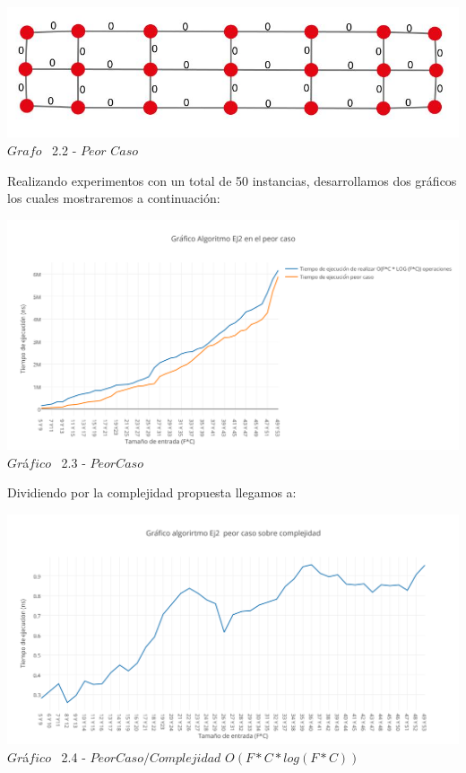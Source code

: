 \vspace*{0.3cm} \vspace*{0.3cm}
  \begin{center}
 \includegraphics[scale=0.5]{./EJ2/ej2grafosinpared.jpeg}
 \\{$Grafo$ \ 2.2 - $Peor$ $Caso$}
  \end{center}
  \vspace*{0.3cm}
  
Realizando experimentos con un total de 50 instancias, desarrollamos dos gr\'aficos los cuales mostraremos a continuaci\'on: \\

\vspace*{0.3cm} \vspace*{0.3cm}
  \begin{center}
 \includegraphics[scale=0.65]{./EJ2/peorcaso.png}
 {$Gr$\'a$fico$ \ 2.3 - $Peor Caso$}
  \end{center}
  \vspace*{0.3cm}


Dividiendo por la complejidad propuesta llegamos a:\\

\vspace*{0.3cm} \vspace*{0.3cm}
  \begin{center}
 \includegraphics[scale=0.65]{./EJ2/peorcaso1.png}
 {$Gr$\'a$fico$ \ 2.4 - $Peor Caso / Complejidad$ $O(F*C* log(F*C))$}
  \end{center}
  \vspace*{0.3cm}

